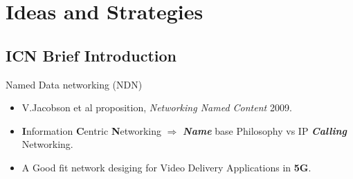 \documentclass[8pt]{beamer}
\newcommand{\1}{\mathbbm 1}
\begin{document}
\section{Ideas and Strategies}

\subsection{ICN Brief Introduction}

\begin{frame}{Named Data networking (NDN)}

\begin{itemize}
\item V.Jacobson et al proposition, \textit{Networking Named Content} 2009.

\item \textbf{I}nformation \textbf{C}entric \textbf{N}etworking $\Rightarrow$ \textit{\textbf{Name}} base Philosophy vs IP \textit{\textbf{Calling}} Networking.

\item A Good fit network desiging for Video Delivery Applications in \textbf{5G}.

\end{itemize}




\end{frame}
\end{document}
